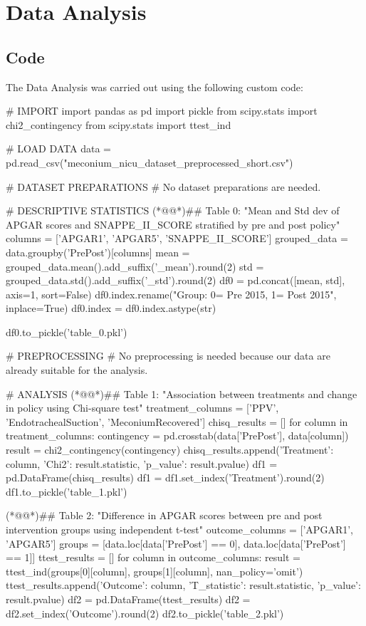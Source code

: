 \documentclass[11pt]{article}
\begin{document}
\section{Data Analysis}
\subsection{{Code}}
The Data Analysis was carried out using the following custom code:

\begin{python}

# IMPORT
import pandas as pd
import pickle
from scipy.stats import chi2_contingency
from scipy.stats import ttest_ind

# LOAD DATA
data = pd.read_csv("meconium_nicu_dataset_preprocessed_short.csv")

# DATASET PREPARATIONS
# No dataset preparations are needed.

# DESCRIPTIVE STATISTICS
(*@@*)## Table 0: "Mean and Std dev of APGAR scores and SNAPPE_II_SCORE stratified by pre and post policy"
columns = ['APGAR1', 'APGAR5', 'SNAPPE_II_SCORE']
grouped_data = data.groupby('PrePost')[columns]
mean = grouped_data.mean().add_suffix('_mean').round(2)
std = grouped_data.std().add_suffix('_std').round(2)
df0 = pd.concat([mean, std], axis=1, sort=False)
df0.index.rename("Group: 0= Pre 2015, 1= Post 2015", inplace=True)
df0.index = df0.index.astype(str) 

df0.to_pickle('table_0.pkl')

# PREPROCESSING
# No preprocessing is needed because our data are already suitable for the analysis.

# ANALYSIS
(*@@*)## Table 1: "Association between treatments and change in policy using Chi-square test"
treatment_columns = ['PPV', 'EndotrachealSuction', 'MeconiumRecovered']
chisq_results = []
for column in treatment_columns:
    contingency = pd.crosstab(data['PrePost'], data[column])
    result = chi2_contingency(contingency)
    chisq_results.append({'Treatment': column, 'Chi2': result.statistic, 'p_value': result.pvalue})
df1 = pd.DataFrame(chisq_results)
df1 = df1.set_index('Treatment').round(2)
df1.to_pickle('table_1.pkl')

(*@@*)## Table 2: "Difference in APGAR scores between pre and post intervention groups using independent t-test"
outcome_columns = ['APGAR1', 'APGAR5']
groups = [data.loc[data['PrePost'] == 0], data.loc[data['PrePost'] == 1]]
ttest_results = []
for column in outcome_columns:
    result = ttest_ind(groups[0][column], groups[1][column], nan_policy='omit')
    ttest_results.append({'Outcome': column, 'T_statistic': result.statistic, 'p_value': result.pvalue})
df2 = pd.DataFrame(ttest_results)
df2 = df2.set_index('Outcome').round(2)
df2.to_pickle('table_2.pkl')


\end{python}
\end{document}
